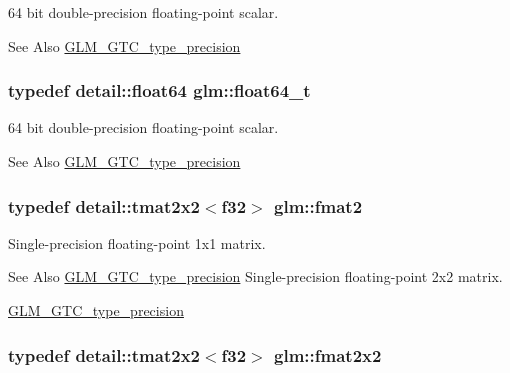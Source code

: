 64 bit double-\/precision floating-\/point scalar. 

\begin{DoxySeeAlso}{See Also}
\hyperlink{group__gtc__type__precision}{G\-L\-M\-\_\-\-G\-T\-C\-\_\-type\-\_\-precision} 
\end{DoxySeeAlso}
\hypertarget{group__gtc__type__precision_gade966a3eb25ebeb16dd53c40d3fdeb46}{
\subsubsection[{float64\-\_\-t}]{\setlength{\rightskip}{0pt plus 5cm}typedef detail\-::float64 {\bf glm\-::float64\-\_\-t}}}\label{group__gtc__type__precision_gade966a3eb25ebeb16dd53c40d3fdeb46}


64 bit double-\/precision floating-\/point scalar. 

\begin{DoxySeeAlso}{See Also}
\hyperlink{group__gtc__type__precision}{G\-L\-M\-\_\-\-G\-T\-C\-\_\-type\-\_\-precision} 
\end{DoxySeeAlso}
\hypertarget{group__gtc__type__precision_ga3b3dcea3b5987db4744388ad0acf22a5}{
\subsubsection[{fmat2}]{\setlength{\rightskip}{0pt plus 5cm}typedef detail\-::tmat2x2$<$f32$>$ {\bf glm\-::fmat2}}}\label{group__gtc__type__precision_ga3b3dcea3b5987db4744388ad0acf22a5}


Single-\/precision floating-\/point 1x1 matrix. 

\begin{DoxySeeAlso}{See Also}
\hyperlink{group__gtc__type__precision}{G\-L\-M\-\_\-\-G\-T\-C\-\_\-type\-\_\-precision} Single-\/precision floating-\/point 2x2 matrix. 

\hyperlink{group__gtc__type__precision}{G\-L\-M\-\_\-\-G\-T\-C\-\_\-type\-\_\-precision} 
\end{DoxySeeAlso}
\hypertarget{group__gtc__type__precision_ga36ec90579d358024a0609ae54c85c345}{
\subsubsection[{fmat2x2}]{\setlength{\rightskip}{0pt plus 5cm}typedef detail\-::tmat2x2$<$f32$>$ {\bf glm\-::fmat2x2}}}\label{group__gtc__type__precision_ga36ec90579d358024a0609ae54c85c345}


